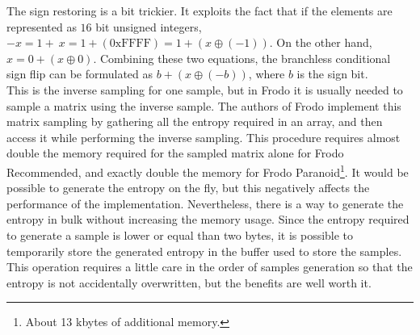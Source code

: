 The sign restoring is a bit trickier. It exploits the fact that if the elements are represented as $16$ bit unsigned integers, $-x=1+~x=1+(\text{0xFFFF})=1+(x\oplus(-1))$. On the other hand,$x=0+(x\oplus0)$. Combining these two equations, the branchless conditional sign flip can be formulated as $b+(x\oplus(-b))$, where $b$ is the sign bit.\\
This is the inverse sampling for one sample, but in Frodo it is usually needed to sample a matrix using the inverse sample. The authors of Frodo implement this matrix sampling by gathering all the entropy required in an array, and then access it while performing the inverse sampling. This procedure requires almost double the memory required for the sampled matrix alone for Frodo Recommended, and exactly double the memory for Frodo Paranoid\footnote{About 13 kbytes of additional memory.}. It would be possible to generate the entropy on the fly, but this negatively affects the performance of the implementation. Nevertheless, there is a way to generate the entropy in bulk without increasing the memory usage. Since the entropy required to generate a sample is lower or equal than two bytes, it is possible to temporarily store the generated entropy in the buffer used to store the samples. This operation requires a little care in the order of samples generation so that the entropy is not accidentally overwritten, but the benefits are well worth it.

